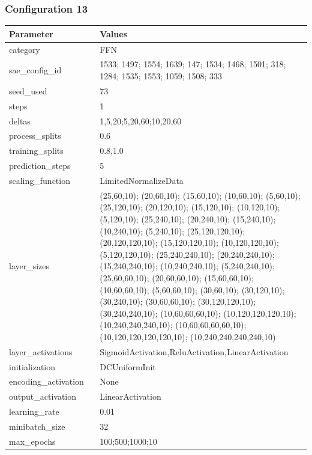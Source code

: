 \documentclass[a4paper,11pt,oneside]{article}
\theoremstyle{plain}
\theoremstyle{definition}
\begin{document}
	\subsubsection{Configuration 13}\label{config13}
	\begin{longtable}[H]{|p{0.3\linewidth}|p{0.7\linewidth}|} \hline \textbf{Parameter} &\textbf{Values} \\\hline{category} & {FFN} \\\hline
		{sae\_config\_id} & {1533; 1497; 1554; 1639; 147; 1534; 1468; 1501; 318; 1284; 1535; 1553; 1059; 1508; 333} \\\hline
		{seed\_used} & {73} \\\hline
		{steps} & {1} \\\hline
		{deltas} & {1,5,20;5,20,60;10,20,60} \\\hline
		{process\_splits} & {0.6} \\\hline
		{training\_splits} & {0.8,1.0} \\\hline
		{prediction\_steps} & {5} \\\hline
		{scaling\_function} & {LimitedNormalizeData} \\\hline
		{layer\_sizes} & {(25,60,10); (20,60,10); (15,60,10); (10,60,10); (5,60,10); (25,120,10); (20,120,10); (15,120,10); (10,120,10); (5,120,10); (25,240,10); (20,240,10); (15,240,10); (10,240,10); (5,240,10); (25,120,120,10); (20,120,120,10); (15,120,120,10); (10,120,120,10); (5,120,120,10); (25,240,240,10); (20,240,240,10); (15,240,240,10); (10,240,240,10); (5,240,240,10); (25,60,60,10); (20,60,60,10); (15,60,60,10); (10,60,60,10); (5,60,60,10); (30,60,10); (30,120,10); (30,240,10); (30,60,60,10); (30,120,120,10); (30,240,240,10); (10,60,60,60,10); (10,120,120,120,10); (10,240,240,240,10); (10,60,60,60,60,10); (10,120,120,120,120,10); (10,240,240,240,240,10)} \\\hline
		{layer\_activations} & {SigmoidActivation,ReluActivation,LinearActivation} \\\hline
		{initialization} & {DCUniformInit} \\\hline
		{encoding\_activation} & {None} \\\hline
		{output\_activation} & {LinearActivation} \\\hline
		{learning\_rate} & {0.01} \\\hline
		{minibatch\_size} & {32} \\\hline
		{max\_epochs} & {100;500;1000;10} \\\hline

\end{longtable}
\end{document}
